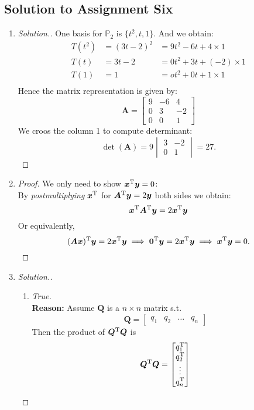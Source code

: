 \subsection{Solution to Assignment Six}
\begin{enumerate}
\item
\begin{proof}[Solution.]
One basis for $\mathbb{P}_2$ is $\{t^2,t,1\}.$ And we obtain:
\begin{align*}
T(t^2)&=(3t-2)^2&=9t^2-6t+4\times 1\\
T(t)&=3t-2&=0t^2+3t+(-2)\times 1\\
T(1)&=1&=ot^2+0t+1\times 1\\
\end{align*}
Hence the matrix representation is given by:
\[
\bm A=\begin{bmatrix}
9&-6&4\\0&3&-2\\0&0&1
\end{bmatrix}
\]
We croos the column 1 to compute determinant:
\[
\det(\bm A)=9\begin{vmatrix}
3&-2\\0&1
\end{vmatrix}=27.
\]
\end{proof}
\item
\begin{proof}
We only need to show $\bm x^{\mathrm T}\bm y=0$:\\
By \textit{postmultiplying} $\bm x^{\mathrm T}$ for $\bm A^{\mathrm T}\bm y=2\bm y$ both sides we obtain:
\[
\bm x^{\mathrm T}\bm A^{\mathrm T}\bm y=2\bm x^{\mathrm T}\bm y
\]
Or equivalently,
\[
(\bm{Ax})^{\mathrm T}\bm y=2\bm x^{\mathrm T}\bm y
\implies
\bm 0^{\mathrm T}\bm y=2\bm x^{\mathrm T}\bm y
\implies
\bm x^{\mathrm T}\bm y=0.
\]
\end{proof}
\item
\begin{proof}[Solution.]
\begin{enumerate}
\item
\textit{True.}\\
\textbf{Reason: }Assume $\bm Q$ is a $n\times n$ matrix s.t. 
\[
\bm Q=\begin{bmatrix}
q_1&q_2&\dots&q_n
\end{bmatrix}
\]
Then the product of $\bm Q^{\mathrm T}\bm Q$ is
\[
\bm Q^{\mathrm T}\bm Q=\begin{bmatrix}
q_1^{\mathrm T}\\q_2^{\mathrm T}\\\vdots\\q_n^{\mathrm T}

\end{bmatrix}\]
\end{enumerate}
\end{proof}
\end{enumerate}
